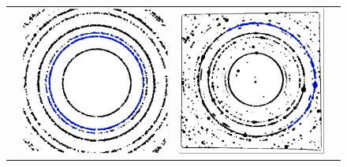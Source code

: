 \documentclass[preprint]{iucr}              %
\begin{document}
\begin{figure}
\centering

\begin{tabular}{>{\centering\arraybackslash}m{.1\linewidth}>{\centering\arraybackslash}m{.25\linewidth}>{\centering\arraybackslash}m{.25\linewidth}>{\centering\arraybackslash}m{.25\linewidth}}
{\color{blue}Region}&
\includegraphics[width=\linewidth]{Detail/o_max1_RF_1_6.png}&
\includegraphics[width=\linewidth]{Detail/o_Si12_0001_RF_2_6.png}&

\end{tabular}
\end{figure}
\end{document}

